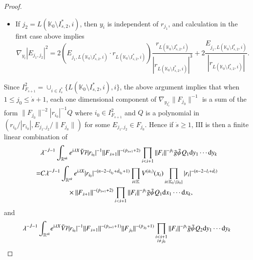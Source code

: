 \documentclass[11pt,reqno]{amsart}
\def\d{{\rm d}}
\def\i{{\rm i}}
\numberwithin{equation}{section}
\theoremstyle{definition}
\begin{document}
\begin{proof}
\begin{itemize}
		\item If $j_2=L(\mathbb{K}_0\setminus I_{\dot{s},2}^*,i)$, then $y_i$ is independent of $r_{j_1}$, and calculation in the first case above implies
		\begin{equation*}
			\nabla_{y_i}\left|E_{j_1,j_2}\right|^2=2\left(E_{j_1,L(\mathbb{K}_0\setminus I_{\dot{s},2}^*,i)}\cdot r_{L(\mathbb{K}_0\setminus I_{\dot{s},2}^*,i)}\right)\frac{r_{L(\mathbb{K}_0\setminus I_{\dot{s},2}^*,i)}}{|r_{L(\mathbb{K}_0\setminus I_{\dot{s},2}^*,i)}|^3}+2\frac{E_{j_1,L(\mathbb{K}_0\setminus I_{\dot{s},2}^*,i)}}{|r_{L(\mathbb{K}_0\setminus I_{\dot{s},2}^*,i)}|}.
		\end{equation*}
	\end{itemize}
	Since $I_{F_{\dot{s}+1}}^2=\cup_{i\in I_{\dot{s}}^*}\{L(\mathbb{K}_0\setminus I_{\dot{s},2}^*,i),i\}$, the above argument implies that when $1\leq j_0\leq\dot{s}+1$, each one dimensional component of $\nabla_{y_{I_{\dot{s}}^*}}\|F_{j_0}\|^{-1}$ is a sum of the form $\|F_{j_0}\|^{-2}|r_{i_0}|^{-1}Q$ where $i_0\in I_{F_{\dot{s}+1}}^2$ and $Q$ is a polynomial in $(r_{i_0}/|r_{i_0}|,E_{j_1,j_2}/\|F_{j_0}\|)$ for some $E_{j_1,j_2}\in F_{j_0}$. Hence if $\dot{s}\geq1$, $\mathrm{III}$ is then a finite linear combination of
	\begin{equation}\label{nabFs+1}
		\begin{split}
			&\lambda^{-\dot{J}-1}\int_{\mathbb{R}^{nk}}e^{\mathrm{i}\lambda X}\tilde{V}\tilde{r}|r_{i_0}|^{-1}\|F_{\dot{s}+1}\|^{-(\dot{p}_{\dot{s}+1}+2)}\prod_{i<\dot{s}+1}\|F_i\|^{-{\dot{p}_i}}\tilde{g}\tilde{\psi}Q_1 \d y_1\cdots \d y_k\\
			=&C\lambda^{-\dot{J}-1}\int_{\mathbb{R}^{nk}}e^{\mathrm{i}\lambda X}|r_{i_0}|^{-(n-2-l_{i_0}+\dot{d}_{i_0}+1)}\prod_{i\in\mathbb{K}}V^{(\dot{\alpha}_i)}(x_i)\prod_{i\in\mathbb{K}_0\setminus\{i_0\}}|r_i|^{-(n-2-l_i+\dot{d}_i)}\\
			&\quad\quad\quad\quad\times\|F_{\dot{s}+1}\|^{-(\dot{p}_{\dot{s}+1}+2)}\prod_{i<\dot{s}+1}\|F_i\|^{-{\dot{p}_i}}\tilde{g}\tilde{\psi}Q_1 \d x_1\cdots \d x_k,
		\end{split}
	\end{equation}
	and	
	\begin{equation}\label{IIIcom}
		\begin{split}
			\lambda^{-\dot{J}-1}\int_{\mathbb{R}^{nk}}&e^{\mathrm{i}\lambda X}\tilde{V}\tilde{r}|r_{i_0}|^{-1}\|F_{\dot{s}+1}\|^{-(\dot{p}_{\dot{s}+1}+1)}\|F_{j_0}\|^{-(\dot{p}_{j_0}+1)}\prod_{\substack{i<\dot{s}+1\\i\neq j_0}}\|F_i\|^{-{\dot{p}_i}}\tilde{g}\tilde{\psi}Q_2 \d y_1\cdots \d y_k\\

\end{split}
\end{equation}
\end{proof}
\end{document}
